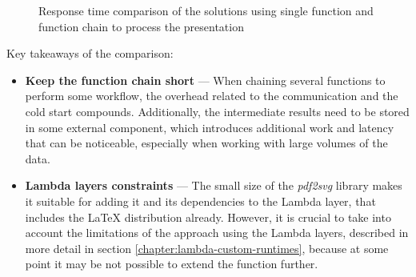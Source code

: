 \datasetChainVsSingle

\begin{figure}[]
    \begin{center}
    \caption{Response time comparison of the solutions using single function and function chain to process the presentation}
    \label{chart:step-function-single-function-vs-function-chain}
    \end{center}
\end{figure}

Key takeaways of the comparison:

\begin{itemize}
   \item \textbf{Keep the function chain short} --- When chaining several functions to perform some workflow, the overhead related to the communication and the cold start compounds. Additionally, the intermediate results need to be stored in some external component, which introduces additional work and latency that can be noticeable, especially when working with large volumes of the data.
   \item \textbf{Lambda layers constraints} --- The small size of the \textit{pdf2svg} library makes it suitable for adding it and its dependencies to the Lambda layer, that includes the LaTeX distribution already. However, it is crucial to take into account the limitations of the approach using the Lambda layers, described in more detail in section \ref{chapter:lambda-custom-runtimes}, because at some point it may be not possible to extend the function further.
\end{itemize}

